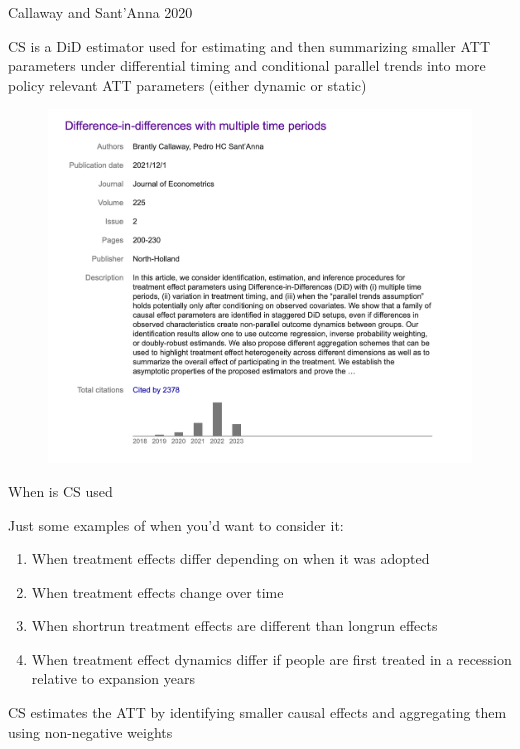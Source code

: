 \documentclass{beamer}
\begin{document}
\begin{frame}{Callaway and Sant'Anna 2020}

CS is a DiD estimator used for estimating and then summarizing smaller ATT parameters under differential timing and conditional parallel trends into more policy relevant ATT parameters (either dynamic or static)


\begin{figure}
\includegraphics[scale=0.25]{./lecture_includes/pedro_cites}
\end{figure}

\end{frame}


\begin{frame}{When is CS used}

Just some examples of when you'd want to consider it:
\begin{enumerate}
\item When treatment effects differ depending on when it was adopted
\item When treatment effects change over time
\item When shortrun treatment effects are different than longrun effects
\item When treatment effect dynamics differ if people are first treated in a recession relative to expansion years
\end{enumerate}

\bigskip

CS estimates the ATT by identifying smaller causal effects and aggregating them using non-negative weights

\end{frame}
\end{document}
